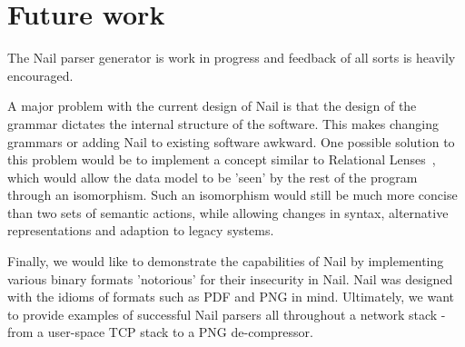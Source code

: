 \section{Future work}
\label{s:future}

The Nail parser generator is work in progress and feedback of all sorts is heavily
encouraged.

A major problem with the current design of Nail is that the design of the grammar dictates the
internal structure of the software. This makes changing grammars or adding Nail to existing software
awkward. One possible solution to this problem would be to implement a concept similar to Relational
Lenses~\cite{bohannon2006relational}, which would allow  the data model to be 'seen' by
the rest of the program through an isomorphism. Such an isomorphism would still be much more concise
than two sets of semantic actions, while allowing changes in syntax, alternative representations
and adaption to legacy systems.

Finally, we would like to demonstrate the capabilities of Nail by implementing various binary
formats 'notorious' for their insecurity in Nail. Nail was designed with the idioms of formats such
as PDF and PNG in mind. Ultimately, we want to provide examples of successful Nail parsers all
throughout a network stack - from a user-space TCP stack to a PNG de-compressor.

